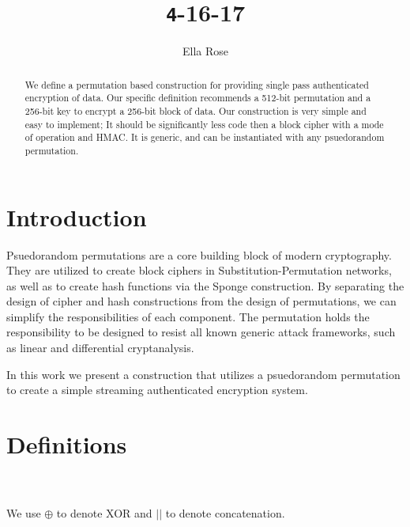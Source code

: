 \documentclass[preprint]{iacrtrans}
\author{Ella Rose\inst{1}}
\institute{Paso Robles, CA\email{python_pride@protonmail.com}}
\title[\texttt 4-16-17]{\texttt 4-16-17}
\begin{document}
\maketitle


\begin{abstract}
 We define a permutation based construction for providing single pass authenticated encryption of data. Our specific definition recommends a 512-bit permutation and a 256-bit key to encrypt a 256-bit block of data. Our construction is very simple and easy to implement; It should be significantly less code then a block cipher with a mode of operation and HMAC. It is generic, and can be instantiated with any psuedorandom permutation.
\end{abstract}

\todototoc
\listoftodos

\section{Introduction}
 Psuedorandom permutations are a core building block of modern cryptography. They are utilized to create block ciphers in Substitution-Permutation networks, as well as to create hash functions via the Sponge construction. By separating the design of cipher and hash constructions from the design of permutations, we can simplify the responsibilities of each component. The permutation holds the responsibility to be designed to resist all known generic attack frameworks, such as linear and differential cryptanalysis. 

In this work we present a construction that utilizes a psuedorandom permutation to create a simple streaming authenticated encryption system.

\section{Definitions}
\\
\\
We use $\oplus$ to denote XOR and $||$ to denote concatenation.
\end{document}
